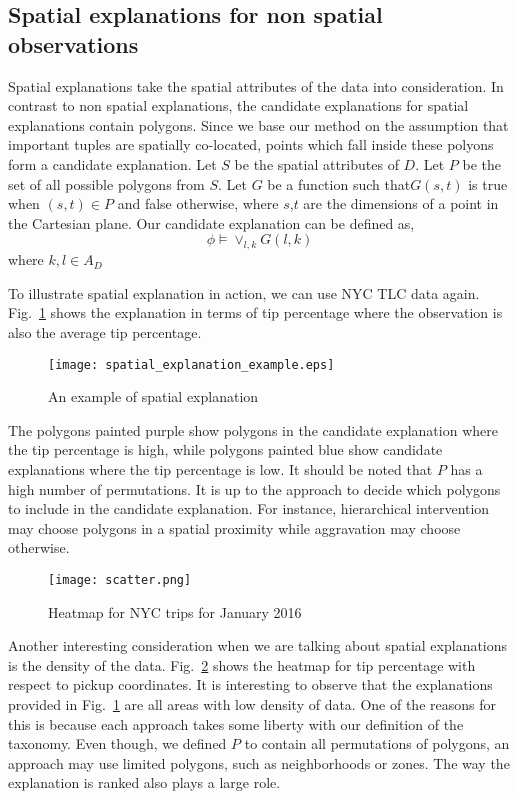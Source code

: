 \subsection{Spatial explanations for non spatial observations}
\label{sec:spatial_nonspatial}

Spatial explanations take the spatial attributes of the data into consideration. In contrast to non spatial explanations, the candidate explanations for spatial explanations contain polygons. Since we base our method on the assumption that important tuples are spatially co-located, points which fall inside these polyons form a candidate explanation. Let $S$ be the spatial attributes of $D$. Let $P$ be the set of all possible polygons from $S$. Let $G$ be a function such that$G(s,t)$ is true when $(s,t) \in P$ and false otherwise, where $s$,$t$ are the dimensions of a point in the Cartesian plane. Our candidate explanation can be defined as,
$$\phi  \models \vee_{l,k} G(l,k)$$
where $k,l \in A_D$

To illustrate spatial explanation in action, we can use NYC TLC data again. Fig.~\ref{fig:spatial_explanation_example} shows the explanation in terms of tip percentage where the observation is also the average tip percentage.

\begin{figure}[ht]
\texttt{[image: spatial\_explanation\_example.eps]}
\caption{An example of spatial explanation}
\label{fig:spatial_explanation_example}
\end{figure}

The polygons painted purple show polygons in the candidate explanation where the tip percentage is high, while polygons painted blue show candidate explanations where the tip percentage is low. It should be noted that $P$ has a high number of permutations. It is up to the approach to decide which polygons to include in the candidate explanation. For instance, hierarchical intervention may choose polygons in a spatial proximity while aggravation may choose otherwise.
\begin{figure}[ht]
\texttt{[image: scatter.png]}
\caption{Heatmap for NYC trips for January 2016}
\label{fig:square_unit_grid}
\end{figure}

Another interesting consideration when we are talking about spatial explanations is the density of the data. Fig.~\ref{fig:square_unit_grid} shows the heatmap for tip percentage with respect to pickup coordinates. It is interesting to observe that the explanations provided in Fig.~\ref{fig:spatial_explanation_example} are all areas with low density of data. One of the reasons for this is because each approach takes some liberty with our definition of the taxonomy. Even though, we defined $P$ to contain all permutations of polygons, an approach may use limited polygons, such as neighborhoods or zones. The way the explanation is ranked also plays a large role.

